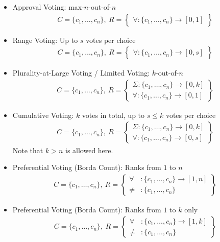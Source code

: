 \documentclass[bibtotoc,halfparskip,oneside]{scrreprt}
\begin{document}
\begin{itemize}
		\item Approval Voting: max-$n$-out-of-$n$ 
		\begin{align*}
			C=\{c_1,\ldots,c_n\},~ 
			R=\left\{\begin{aligned}\forall:\{c_1,\ldots,c_n\}\rightarrow[0,1]\end{aligned}\right\}
		\end{align*}
		
		\item Range Voting: Up to $s$ votes per choice
		\begin{align*}
			C=\{c_1,\ldots,c_n\},~ 
			R=\left\{\begin{aligned}\forall:\{c_1,\ldots,c_n\}\rightarrow[0,s]\end{aligned}\right\}
		\end{align*}
		
		\item Plurality-at-Large Voting / Limited Voting: $k$-out-of-$n$
		\begin{align*}
			C=\{c_1,\ldots,c_n\},~ 
			R=\left\{\begin{aligned}\Sigma:\{c_1,\ldots,c_n\}\rightarrow[0,k] \\ \forall:\{c_1,\ldots,c_n\}\rightarrow[0,1]\end{aligned}\right\}
		\end{align*}
		
		\item Cumulative Voting: $k$ votes in total, up to $s\leq k$ votes per choice
		\begin{align*}
			C=\{c_1,\ldots,c_n\},~ 
			R=\left\{\begin{aligned}\Sigma:\{c_1,\ldots,c_n\}\rightarrow[0,k] \\ \forall:\{c_1,\ldots,c_n\}\rightarrow[0,s]\end{aligned}\right\}
		\end{align*}
		Note that $k>n$ is allowed here.
		
		\item Preferential Voting (Borda Count): Ranks from $1$ to $n$
		\begin{align*}
			C=\{c_1,\ldots,c_n\},~ 
			R=\left\{\begin{aligned}\forall&:\{c_1,\ldots,c_n\}\rightarrow[1,n] \\ \not=&:\{c_1,\ldots,c_n\} \end{aligned}\right\}
		\end{align*}
		\item Preferential Voting (Borda Count): Ranks from $1$ to $k$ only
		\begin{align*}
			C=\{c_1,\ldots,c_n\},~ 
			R=\left\{\begin{aligned}\forall&:\{c_1,\ldots,c_n\}\rightarrow[1,k] \\ \not=&:\{c_1,\ldots,c_n\} \end{aligned}\right\}
		\end{align*}
		

\end{itemize}
\end{document}
